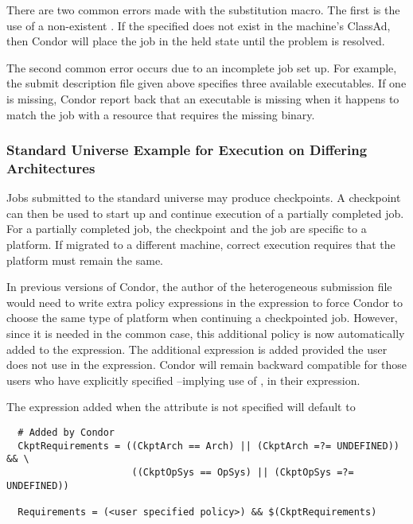 There are two common errors made with the substitution macro.
The first is the use of a non-existent .
If the specified  does not
exist in the machine's ClassAd, then Condor will place
the job in the held state until the problem is resolved.

The second common error occurs due to an incomplete job set up.
For example, the submit description file given above specifies
three available executables.
If one is missing, Condor report back that an
executable is missing when it happens to match the
job with a resource that requires the missing binary.

\subsubsection{Standard Universe Example for Execution on Differing Architectures} 

Jobs submitted to the standard universe may produce checkpoints.
A checkpoint can then be used to start up and continue execution
of a partially completed job.
For a partially completed job, the checkpoint and the job are specific
to a platform.
If migrated to a different machine, correct execution requires that
the platform must remain the same.

In previous versions of Condor, the author of the heterogeneous
submission file would need to write extra policy expressions in the
 expression to force Condor to choose the
same type of platform when continuing a checkpointed job.
However, since it is needed in the common case, this
additional policy is now automatically added
to the  expression.
The additional expression is added
provided the user does not use
 in the  expression.
Condor will remain backward compatible for those users who have explicitly
specified --implying use of ,
in their  expression.

The expression added when the attribute  is not specified 
will default to

\footnotesize
\begin{verbatim}
  # Added by Condor
  CkptRequirements = ((CkptArch == Arch) || (CkptArch =?= UNDEFINED)) && \
                      ((CkptOpSys == OpSys) || (CkptOpSys =?= UNDEFINED))

  Requirements = (<user specified policy>) && $(CkptRequirements)
\end{verbatim}
\normalsize

